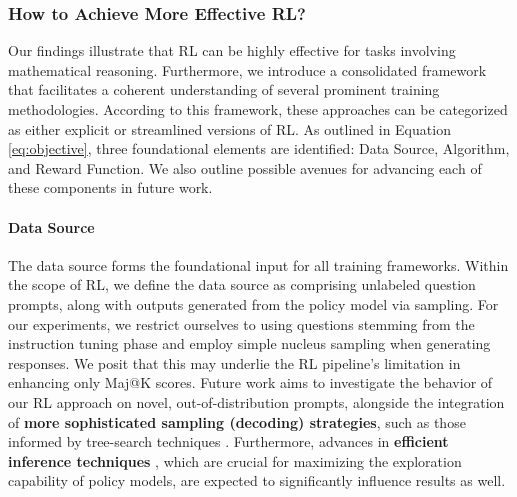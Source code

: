 \begin{itemize}[topsep=0pt]
\begin{itemize}[topsep=0pt]
\subsubsection{How to Achieve More Effective RL?}
\label{sec:effec_rl}
Our findings illustrate that RL can be highly effective for tasks involving mathematical reasoning. Furthermore, we introduce a consolidated framework that facilitates a coherent understanding of several prominent training methodologies. According to this framework, these approaches can be categorized as either explicit or streamlined versions of RL. As outlined in Equation \ref{eq:objective}, three foundational elements are identified: Data Source, Algorithm, and Reward Function. We also outline possible avenues for advancing each of these components in future work.

\paragraph{Data Source} The data source forms the foundational input for all training frameworks. Within the scope of RL, we define the data source as comprising unlabeled question prompts, along with outputs generated from the policy model via sampling. For our experiments, we restrict ourselves to using questions stemming from the instruction tuning phase and employ simple nucleus sampling when generating responses. We posit that this may underlie the RL pipeline’s limitation in enhancing only Maj@K scores. Future work aims to investigate the behavior of our RL approach on novel, out-of-distribution prompts, alongside the integration of \textbf{more sophisticated sampling (decoding) strategies}, such as those informed by tree-search techniques \citep{yao2023tree}. Furthermore, advances in \textbf{efficient inference techniques} \citep{xia-etal-2023-speculative,leviathan2023fast,kwon2023efficient,xia2024unlocking}, which are crucial for maximizing the exploration capability of policy models, are expected to significantly influence results as well.


\end{itemize}
\end{itemize}
